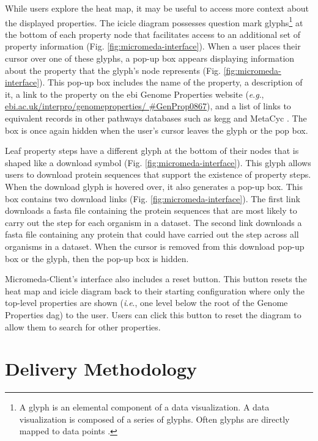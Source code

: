 While users explore the heat map, it may be useful to access more context about 
the displayed properties. The icicle diagram possesses question mark 
glyphs\footnote{A glyph is an elemental component of a data visualization. A 
data visualization is composed of a series of glyphs. Often glyphs are directly 
mapped to data points \cite{chen}.} at the bottom of each property node that 
facilitates access to an additional set of property information (Fig. 
\ref{fig:micromeda-interface}). When a user places their cursor over one of 
these glyphs, a pop-up box appears displaying information about the property 
that the glyph's node represents (Fig. \ref{fig:micromeda-interface}). This 
pop-up box includes the name of the property, a description of it, a link to the 
property on the \gls{ebi}  Genome Properties website (\textit{e}.\textit{g}., 
\href{https://www.ebi.ac.uk/interpro/genomeproperties/#GenProp0867}{ebi.ac.uk/interpro/genomeproperties/ 
\#GenProp0867}), and a list of links to equivalent records in other pathways 
databases such as \gls{kegg} \cite{kanehisa2000kegg} and MetaCyc 
\cite{karp2002metacyc}. The box is once again hidden when the user's cursor 
leaves the glyph or the pop box.

Leaf property steps have a different glyph at the bottom of their nodes that is 
shaped like a download symbol (Fig. \ref{fig:micromeda-interface}). This glyph 
allows users to download protein sequences that support the existence of 
property steps. When the download glyph is hovered over, it also generates a 
pop-up box. This box contains two download links (Fig. 
\ref{fig:micromeda-interface}). The first link downloads a \gls{fasta} file containing 
the protein sequences that are most likely to carry out the step for each 
organism in a dataset. The second link downloads a \gls{fasta} file containing any 
protein that could have carried out the step across all organisms in a dataset. 
When the cursor is removed from this download pop-up box or the glyph, then the 
pop-up box is hidden.

Micromeda-Client's interface also includes a reset button. This button resets 
the heat map and icicle diagram back to their starting configuration where only 
the top-level properties are shown (\textit{i}.\textit{e}., one level below the root of the Genome 
Properties \gls{dag}) to the user. Users can click this button to reset the 
diagram to allow them to search for other properties.

\section{Delivery Methodology} \label{client-delivery-method}

